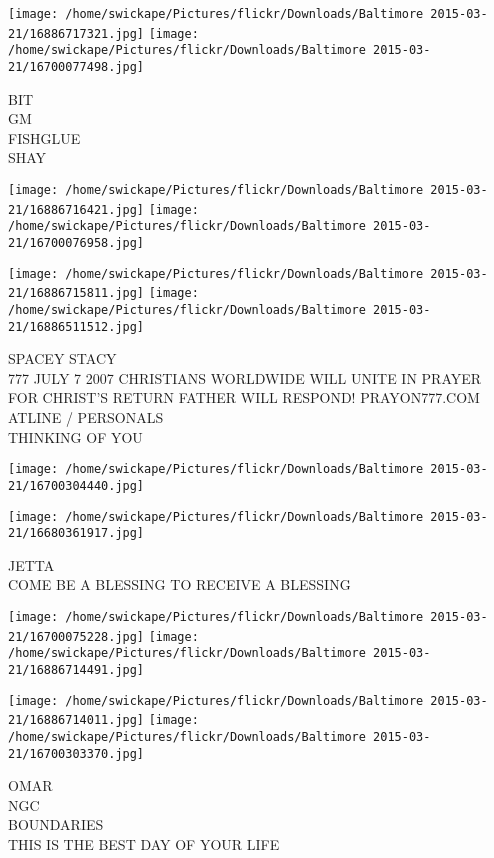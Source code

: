 \documentclass[10pt,letterpaper]{article}
\begin{document}
\texttt{[image: /home/swickape/Pictures/flickr/Downloads/Baltimore 2015-03-21/16886717321.jpg]}
\texttt{[image: /home/swickape/Pictures/flickr/Downloads/Baltimore 2015-03-21/16700077498.jpg]}

BIT\\
GM\\
FISHGLUE\\
SHAY\\
\pagebreak

\texttt{[image: /home/swickape/Pictures/flickr/Downloads/Baltimore 2015-03-21/16886716421.jpg]}
\texttt{[image: /home/swickape/Pictures/flickr/Downloads/Baltimore 2015-03-21/16700076958.jpg]}

\texttt{[image: /home/swickape/Pictures/flickr/Downloads/Baltimore 2015-03-21/16886715811.jpg]}
\texttt{[image: /home/swickape/Pictures/flickr/Downloads/Baltimore 2015-03-21/16886511512.jpg]}

SPACEY STACY\\
777 JULY 7 2007 CHRISTIANS WORLDWIDE WILL UNITE IN PRAYER FOR CHRIST'S RETURN FATHER WILL RESPOND! PRAYON777.COM\\
ATLINE / PERSONALS\\
THINKING OF YOU\\
\pagebreak

\texttt{[image: /home/swickape/Pictures/flickr/Downloads/Baltimore 2015-03-21/16700304440.jpg]}

\vspace{0.25in}
\texttt{[image: /home/swickape/Pictures/flickr/Downloads/Baltimore 2015-03-21/16680361917.jpg]}

JETTA\\
COME BE A BLESSING TO RECEIVE A BLESSING\\
\pagebreak

\texttt{[image: /home/swickape/Pictures/flickr/Downloads/Baltimore 2015-03-21/16700075228.jpg]}
\texttt{[image: /home/swickape/Pictures/flickr/Downloads/Baltimore 2015-03-21/16886714491.jpg]}

\texttt{[image: /home/swickape/Pictures/flickr/Downloads/Baltimore 2015-03-21/16886714011.jpg]}
\texttt{[image: /home/swickape/Pictures/flickr/Downloads/Baltimore 2015-03-21/16700303370.jpg]}

OMAR\\
NGC\\
BOUNDARIES\\
THIS IS THE BEST DAY OF YOUR LIFE\\
\pagebreak
\end{document}
